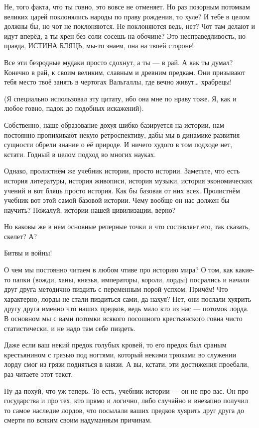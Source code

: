 Не, того факта, что ты говно, это вовсе не отменяет. Но раз позорным потомкам
великих царей поклонялись народы по праву рождения, то хуле? И тебе в целом
должны бы, но чот не поклоняются. Не поклоняются ведь, нет? Чот там делают и
идут вперёд, а ты хрен без соли сосешь на обочине? Это несправедливость, но
правда, ИСТИНА БЛЯЦЬ, мы-то знаем, она на твоей стороне!

Все эти безродные мудаки просто сдохнут, а ты — в рай. А как ты думал? Конечно
в рай, к своим великим, славным и древним предкам. Они призывают тебя место
твоё занять в чертогах Вальгаллы, где вечно живут… храбрецы! 

(Я специально использовал эту цитату, ибо она мне по нраву тоже. Я, как и любое
говно, падок до подобных искажений).

Собственно, наше образование дохуя шибко базируется на истории, нам постоянно
пропихивают некую ретроспективу, дабы мы в динамике развития сущности обрели
знание о её природе. И ничего худого в том подходе нет, кстати. Годный в целом
подход во многих науках.

Однако, пролистнём же учебник истории, просто истории. Заметьте, что есть
история литературы, история живописи, история музыки, история экономических
учений и вот бляць просто история. Как бы базовая от них всех. Пролистнём
учебник вот этой самой базовой истории. Чему вообще он нас должен бы научить?
Пожалуй, истории нашей цивилизации, верно?

Но каковы же в нем основные реперные точки и что составляет его, так сказать,
скелет? А? 

Битвы и войны!

О чем мы постоянно читаем в любом чтиве про историю мира? О том, как какие-то
папки (вожди, ханы, князья, императоры, короли, лорды) посрались и начали друг
друга методично пиздить с переменным порой успхом. Причём! Что характерно,
лорды не стали пиздиться сами, да нахуя? Нет, они послали хуярить другу друга
именно что наших предков, ведь мало кто из нас — потомок лорда. В основном мы с
вами потомки всякого посошного крестьянского говна чисто статистически, и не
надо там себе пиздеть. 

Даже если ваш некий предок голубых кровей, то его предок был сраным
крестьянином с грязью под ногтями, который некими трюками во служении лорду
смог из грязи подняться в князи. А вы, кстати, эти достижения проебали, раз
читаете этот текст.

Ну да похуй, что уж теперь. То есть, учебник истории — он не про вас. Он про
государства и про тех, кто прямо и логично, либо случайно и внезапно получил то
самое наследие лордов, что посылали ваших предков хуярить друг друга до смерти
по всяким своим надуманным причинам.

